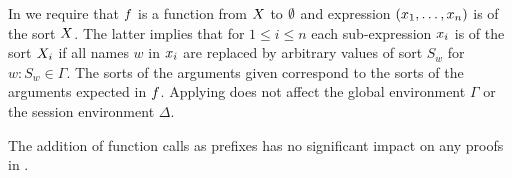 In \RSideEffect we require that $f$ is a function from $X$ to $\emptyset$ and expression $\left(x_1,\ldots,x_n\right)$ is of the sort $X$.
The latter implies that for $1 \leq i \leq n$ each sub-expression $x_i$ is of the sort $X_i$ if all names $w$ in $x_i$ are replaced by arbitrary values of sort $S_w$ for $w:S_w \in \Gamma$.
The sorts of the arguments given correspond to the sorts of the arguments expected in $f$.
Applying \RSideEffect does not affect the global environment $\Gamma$ or the session environment $\Delta$.

The addition of function calls as prefixes has no significant impact on any proofs in \cite{PetersEtal21}.
